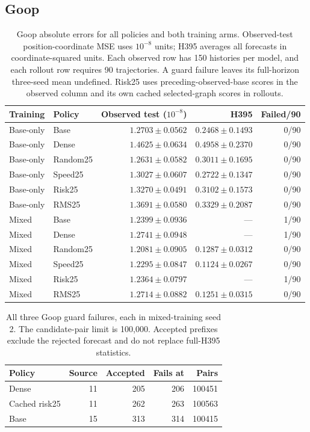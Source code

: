 \subsection{Goop}
\label{sec:goop-graph-exposure}
\begin{table}[!ht]
\centering\small
\setlength{\tabcolsep}{5pt}\renewcommand{\arraystretch}{1.12}
\caption{Goop absolute errors for all policies and both training arms. Observed-test position-coordinate MSE uses $10^{-8}$ units; H395 averages all forecasts in coordinate-squared units. Each observed row has 150 histories per model, and each rollout row requires 90 trajectories. A guard failure leaves its full-horizon three-seed mean undefined. Risk25 uses preceding-observed-base scores in the observed column and its own cached selected-graph scores in rollouts.}
\label{tab:goop-all-observed}
\label{tab:goop-all-rollouts}
\begin{tabular}{llrrr}
\toprule
Training & Policy & Observed test ($10^{-8}$) & H395 & Failed/90\\
\midrule
Base-only & Base & $1.2703\pm0.0562$ & $0.2468\pm0.1493$ & 0/90\\
Base-only & Dense & $1.4625\pm0.0634$ & $0.4958\pm0.2370$ & 0/90\\
Base-only & Random25 & $1.2631\pm0.0582$ & $0.3011\pm0.1695$ & 0/90\\
Base-only & Speed25 & $1.3027\pm0.0607$ & $0.2722\pm0.1347$ & 0/90\\
Base-only & Risk25 & $1.3270\pm0.0491$ & $0.3102\pm0.1573$ & 0/90\\
Base-only & RMS25 & $1.3691\pm0.0580$ & $0.3329\pm0.2087$ & 0/90\\
Mixed & Base & $1.2399\pm0.0936$ & --- & 1/90\\
Mixed & Dense & $1.2741\pm0.0948$ & --- & 1/90\\
Mixed & Random25 & $1.2081\pm0.0905$ & $0.1287\pm0.0312$ & 0/90\\
Mixed & Speed25 & $1.2295\pm0.0847$ & $0.1124\pm0.0267$ & 0/90\\
Mixed & Risk25 & $1.2364\pm0.0797$ & --- & 1/90\\
Mixed & RMS25 & $1.2714\pm0.0882$ & $0.1251\pm0.0315$ & 0/90\\
\bottomrule
\end{tabular}
\end{table}

\begin{table}[!ht]\centering\small
\caption{All three Goop guard failures, each in mixed-training seed 2. The candidate-pair limit is 100,000. Accepted prefixes exclude the rejected forecast and do not replace full-H395 statistics.}
\label{tab:goop-all-failures}
\begin{tabular}{lrrrr}
\toprule
Policy & Source & Accepted & Fails at & Pairs\\
\midrule
Dense & 11 & 205 & 206 & 100451\\
Cached risk25 & 11 & 262 & 263 & 100563\\
Base & 15 & 313 & 314 & 100415\\
\bottomrule
\end{tabular}
\end{table}

